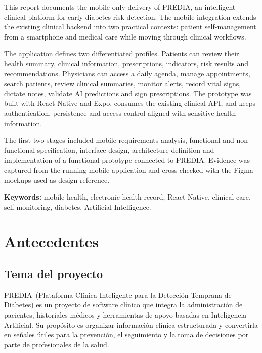 \documentclass[12pt,letterpaper]{report}
\newcommand{\projectname}{PREDIA}
\begin{document}
This report documents the mobile-only delivery of \projectname, an intelligent clinical platform for early diabetes risk detection. The mobile integration extends the existing clinical backend into two practical contexts: patient self-management from a smartphone and medical care while moving through clinical workflows.

The application defines two differentiated profiles. Patients can review their health summary, clinical information, prescriptions, indicators, risk results and recommendations. Physicians can access a daily agenda, manage appointments, search patients, review clinical summaries, monitor alerts, record vital signs, dictate notes, validate AI predictions and sign prescriptions. The prototype was built with React Native and Expo, consumes the existing clinical API, and keeps authentication, persistence and access control aligned with sensitive health information.

The first two stages included mobile requirements analysis, functional and non-functional specification, interface design, architecture definition and implementation of a functional prototype connected to \projectname. Evidence was captured from the running mobile application and cross-checked with the Figma mockups used as design reference.

\noindent\textbf{Keywords:} mobile health, electronic health record, React Native, clinical care, self-monitoring, diabetes, Artificial Intelligence.

\tableofcontents
\clearpage

\listoffigures
{}
\clearpage

\chapter{Antecedentes}

\section{Tema del proyecto}

\projectname\ (Plataforma Clínica Inteligente para la Detección Temprana de Diabetes) es un proyecto de software clínico que integra la administración de pacientes, historiales médicos y herramientas de apoyo basadas en Inteligencia Artificial. Su propósito es organizar información clínica estructurada y convertirla en señales útiles para la prevención, el seguimiento y la toma de decisiones por parte de profesionales de la salud.
\end{document}
